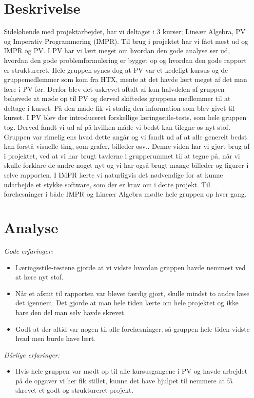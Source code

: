 \section{Beskrivelse}
Sideløbende med projektarbejdet, har vi deltaget i 3 kurser; Lineær Algebra, PV og Imperativ Programmering (IMPR). Til brug i projektet har vi fået mest ud og IMPR og PV. I PV har vi lært meget om hvordan den gode analyse ser ud, hvordan den gode problemformulering er bygget op og hvordan den gode rapport er struktureret. Hele gruppen synes dog at PV var et kedeligt kursus og de gruppemedlemmer som kom fra HTX, mente at det havde lært meget af det man lære i PV før. Derfor blev det uskrevet aftalt af kun halvdelen af gruppen behøvede at møde op til PV og derved skiftedes gruppens medlemmer til at deltage i kurset. På den måde fik vi stadig den information som blev givet til kurset.
I PV blev der introduceret forskellige læringsstile-tests, som hele gruppen tog. Derved fandt vi ud af på hvilken måde vi bedst kan tilegne os nyt stof. Gruppen var rimelig ens hvad dette angår og vi fandt ud af at alle generelt bedst kan forstå visuelle ting, som grafer, billeder osv.. Denne viden har vi gjort brug af i projektet, ved at vi har brugt tavlerne i grupperummet til at tegne på, når vi skulle forklare de andre noget nyt og vi har også brugt mange billeder og figurer i selve rapporten. 
I IMPR lærte vi naturligvis det nødvendige for at kunne udarbejde et stykke software, som der er krav om i dette projekt. Til forelæsninger i både IMPR og Lineær Algebra mødte hele gruppen op hver gang. 

\section{Analyse}

\emph{Gode erfaringer:}
\begin{itemize}
\item	Læringsstile-testene gjorde at vi vidste hvordan gruppen havde nemmest ved at lære nyt stof. 

\item	 Når et afsnit til rapporten var blevet færdig gjort, skulle mindst to andre læse det igennem. Det gjorde at man hele tiden lærte om hele projektet og ikke bare den del man selv havde skrevet. 

\item	Godt at der altid var nogen til alle forelæsninger, så gruppen hele tiden vidste hvad men burde have lært.
\end{itemize}\emph{Dårlige erfaringer:}
\begin{itemize}
\item	Hvis hele gruppen var mødt op til alle kursusgangene i PV og havde arbejdet på de opgaver vi her fik stillet, kunne det have hjulpet til nemmere at få skrevet et godt og struktureret projekt. 

\end{itemize}	 


